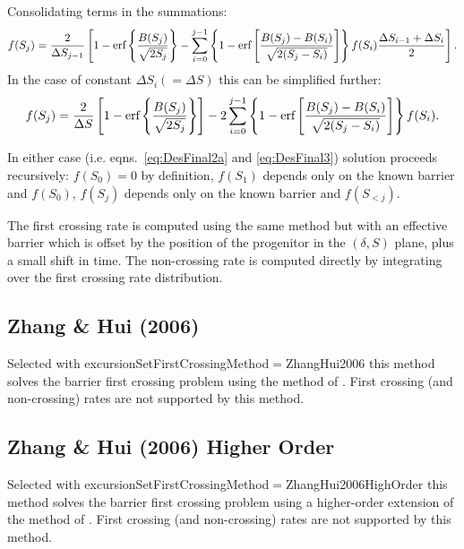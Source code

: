 Consolidating terms in the summations:
\begin{equation} \label{eq:DesFinal2a}
   f(S_j) = {2 \over \Delta S_{j-1}}\left[1 -  \hbox{erf}\left\{\frac{B(S_j)}{\sqrt{2S_j}}\right\} - \sum_{i=0}^{j-1} \left\{ 1-\hbox{erf}\left[\frac{B(S_j) - B(S_i)}{\sqrt{2 (S_j-S_i)}}\right] \right\} f(S_i) {\Delta S_{i-1} + \Delta S_i \over 2} \right].
\end{equation}
In the case of constant $\Delta S_i(=\Delta S)$ this can be simplified further:
\begin{equation} \label{eq:DesFinal3}
   f(S_j) = {2 \over \Delta S}\left[1 - \hbox{erf}\left\{\frac{B(S_j)}{\sqrt{2S_j}}\right\}\right] - 2 \sum_{i=0}^{j-1} \left\{1- \hbox{erf}\left[\frac{B(S_j) - B(S_i)}{\sqrt{2 (S_j-S_i)}}\right] \right\} f(S_i).
\end{equation}

In either case (i.e. eqns.~\ref{eq:DesFinal2a} and \ref{eq:DesFinal3}) solution proceeds recursively: $f(S_0)=0$ by definition, $f(S_1)$ depends only on the known barrier and $f(S_0)$, $f(S_j)$ depends only on the known barrier and $f(S_{<j})$.

The first crossing rate is computed using the same method but with an effective barrier which is offset by the position of the progenitor in the $(\delta,S)$ plane, plus a small shift in time. The non-crossing rate is computed directly by integrating over the first crossing rate distribution.

\subsection{Zhang \& Hui (2006)}

Selected with {\normalfont \ttfamily excursionSetFirstCrossingMethod}$=${\normalfont \ttfamily ZhangHui2006} this method solves the barrier first crossing problem using the method of \cite{zhang_random_2006}. First crossing (and non-crossing) rates are not supported by this method.

\subsection{Zhang \& Hui (2006) Higher Order}

Selected with {\normalfont \ttfamily excursionSetFirstCrossingMethod}$=${\normalfont \ttfamily ZhangHui2006HighOrder} this method solves the barrier first crossing problem using a higher-order extension of the method of \cite{zhang_random_2006}. First crossing (and non-crossing) rates are not supported by this method.

